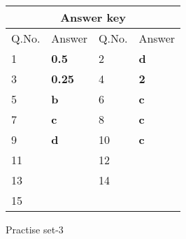 \begin{table}[H]
	\centering
	\begin{tabular}{|p{1.5cm}|p{1.5cm}||p{1.5cm}|p{1.5cm}|}
		\hline
		\multicolumn{4}{|c|}{\textbf{Answer key}}\\\hline\hline
		\rowcolor{ocrel}Q.No.&Answer&Q.No.&Answer\\\hline
		1&\textbf{0.5} &2&\textbf{d}\\\hline 
		3&\textbf{0.25} &4&\textbf{2} \\\hline
		5&\textbf{b} &6&\textbf{c} \\\hline
		7&\textbf{c}&8&\textbf{c}\\\hline
		9&\textbf{d}&10&\textbf{c}\\\hline
		11&\textbf{} &12&\textbf{}\\\hline
		13&\textbf{}&14&\textbf{}\\\hline
		15&\textbf{}& &\\\hline
		
	\end{tabular}
\end{table}
\newpage
\begin{abox}
	Practise set-3
\end{abox}
